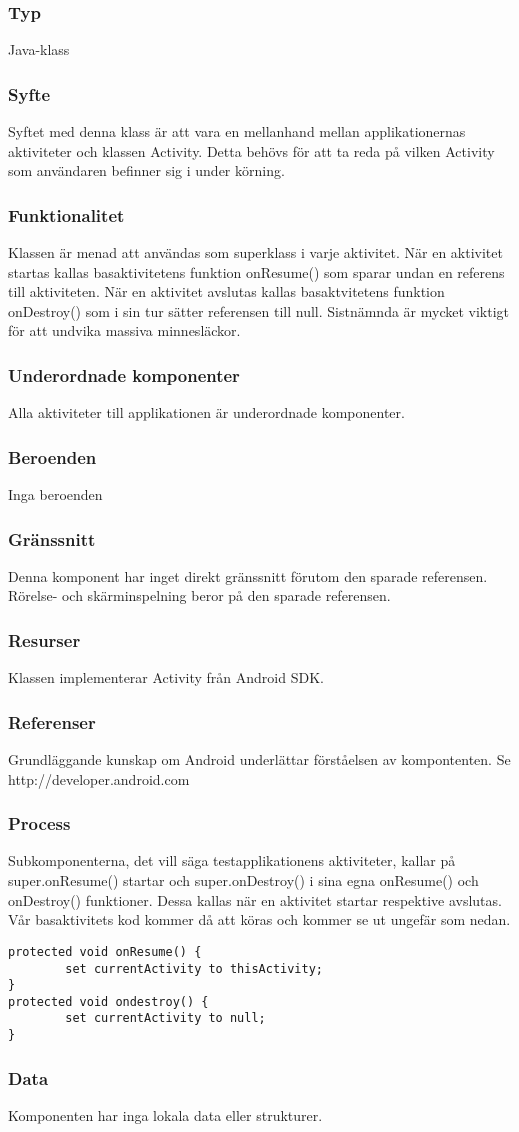 \subsubsection{Typ}
Java-klass
\subsubsection{Syfte}
Syftet med denna klass är att vara en mellanhand mellan applikationernas aktiviteter och klassen Activity. Detta behövs för att ta reda på vilken Activity som användaren befinner sig i under körning.
\subsubsection{Funktionalitet}
Klassen är menad att användas som superklass i varje aktivitet. När en aktivitet startas kallas basaktivitetens funktion onResume() som sparar undan en referens till aktiviteten. När en aktivitet avslutas kallas basaktvitetens funktion onDestroy() som i sin tur sätter referensen till null. Sistnämnda är mycket viktigt för att undvika massiva minnesläckor.
\subsubsection{Underordnade komponenter}
Alla aktiviteter till applikationen är underordnade komponenter. 
\subsubsection{Beroenden}
Inga beroenden
\subsubsection{Gränssnitt}
Denna komponent har inget direkt gränssnitt förutom den sparade referensen. Rörelse- och skärminspelning beror på den sparade referensen.
\subsubsection{Resurser}
Klassen implementerar Activity från Android SDK.
\subsubsection{Referenser}
Grundläggande kunskap om Android underlättar förståelsen av kompontenten. Se http://developer.android.com
\subsubsection{Process}
Subkomponenterna, det vill säga testapplikationens aktiviteter, kallar på super.onResume() startar och super.onDestroy() i sina egna onResume() och onDestroy() funktioner. Dessa kallas när en aktivitet startar respektive avslutas. Vår basaktivitets kod kommer då att köras och kommer se ut ungefär som nedan.
\begin{verbatim}
protected void onResume() {
		set currentActivity to thisActivity;
}
protected void ondestroy() {
		set currentActivity to null;
}
\end{verbatim}
\subsubsection{Data}
 Komponenten har inga lokala data eller strukturer.
